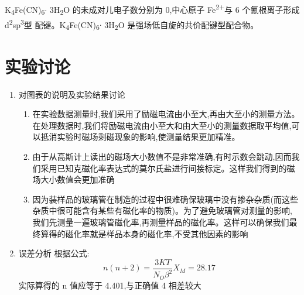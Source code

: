 \documentclass[11pt]{report}
\begin{document}
K\textsubscript{4}Fe(CN)\textsubscript{6}\(\cdot\) 3H\textsubscript{2}O 的未成对儿电子数分别为 0,中心原子 Fe\textsuperscript{2+}与 6 个氰根离子形成 d\textsuperscript{2}sp\textsuperscript{3}型
配键。K\textsubscript{4}Fe(CN)\textsubscript{6}\(\cdot\) 3H\textsubscript{2}O 是强场低自旋的共价配键型配合物。

\section{实验讨论}
\label{sec:orge4cb55b}
\begin{enumerate}
\item 对图表的说明及实验结果讨论
\label{sec:org6892176}
\begin{enumerate}
\item 在实验数据测量时,我们采用了励磁电流由小至大,再由大至小的测量方法。在处理数据时,我们将励磁电流由小至大和由大至小的测量数据取平均值,可以抵消实验时磁场剩磁现象的影响,使测量结果更加精准。
\item 由于从高斯计上读出的磁场大小数值不是非常准确,有时示数会跳动,因而我们采用已知克磁化率表达式的莫尔氏盐进行间接标定。这样我们得到的磁场大小数值会更加准确
\item 因为装样品的玻璃管在制造的过程中很难确保玻璃中没有掺杂杂质(而这些杂质中很可能含有某些有磁化率的物质)。为了避免玻璃管对测量的影响,我们先测量一遍玻璃管磁化率,再测量样品的磁化率。这样可以确保我们最终算得的磁化率就是样品本身的磁化率,不受其他因素的影响
\end{enumerate}
\item 误差分析
\label{sec:orgce2e4ac}
     根据公式:
     \[
     n(n+2)=\frac{3KT}{N_{O}\beta^{2}}X_{M}=28.17
     \]
实际算得的 n 值应等于 4.401,与正确值 4 相差较大


\end{enumerate}
\end{document}
